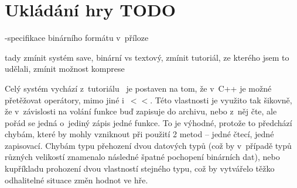
\section{Ukládání hry TODO}



-specifikace binárního formátu v~příloze 

tady zmínit systém save, binární vs textový, zmínit tutoriál, ze kterého jsem to udělali, zmínit možnost komprese



Celý systém vychází z~tutoriálu~\citep{ue_save_system} je postaven na tom, že v~C++ je možné přetěžovat operátory, mimo jiné i~$<<$. Této vlastnosti je využito tak šikovně, že v~závislosti na volání funkce buď zapisuje do archivu, nebo z~něj čte, ale pořád se jedná o~jediný zápis jedné funkce. To je výhodné, protože to předchází chybám, které by mohly vzniknout při použití 2 metod -- jedné čtecí, jedné zapisovací. Chybám typu přehození dvou datových typů (což by v~případě typů různých velikostí znamenalo následné špatné pochopení binárních dat), nebo kupříkladu prohození dvou vlastností stejného typu, což by vytvářelo těžko odhalitelné situace změn hodnot ve hře.
